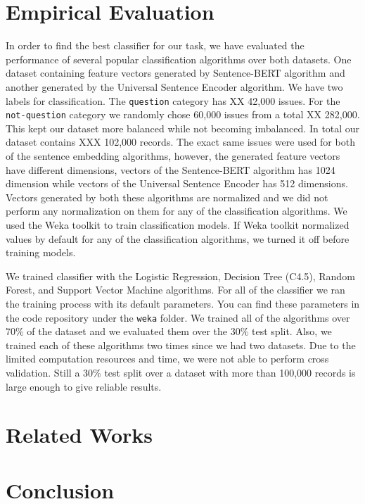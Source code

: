 \documentclass[conference]{IEEEtran}
\begin{document}
\section{Empirical Evaluation}\label{eval}
In order to find the best classifier for our task, we have evaluated the performance of several popular
classification algorithms over both datasets. One dataset containing feature vectors generated by 
Sentence-BERT algorithm and another generated by the Universal Sentence Encoder algorithm. We have two labels for
classification. The \verb|question| category has XX 42,000 issues. For the \verb|not-question| category 
we randomly chose 60,000 issues from a total XX 282,000. This kept our dataset more balanced while 
not becoming imbalanced. In total our dataset contains XXX 102,000 records. The exact same issues were used 
for both of the sentence embedding algorithms, however, the generated feature vectors have different dimensions, 
vectors of the Sentence-BERT algorithm has 1024 dimension while vectors of the Universal Sentence Encoder has 
512 dimensions. Vectors generated by both these algorithms are normalized and we did not perform any normalization
on them for any of the classification algorithms. We used the Weka toolkit to train classification models. 
If Weka toolkit normalized values by default for any of the classification algorithms, 
we turned it off before training models. 

We trained classifier with the Logistic Regression, Decision Tree (C4.5), Random Forest, and Support Vector Machine
algorithms. For all of the classifier we ran the training process with its default parameters. You can find 
these parameters in the code repository under the \verb|weka| folder. We trained all of the algorithms over 70\%
of the dataset and we evaluated them over the 30\% test split. Also, we trained each of these algorithms two 
times since we had two datasets. Due to the limited computation resources and time, we were not able to 
perform cross validation. Still a 30\% test split over a dataset with more than 100,000 records is large enough 
to give reliable results.


\section{Related Works}\label{relworks}

\section{Conclusion}\label{conclusion}
\end{document}
